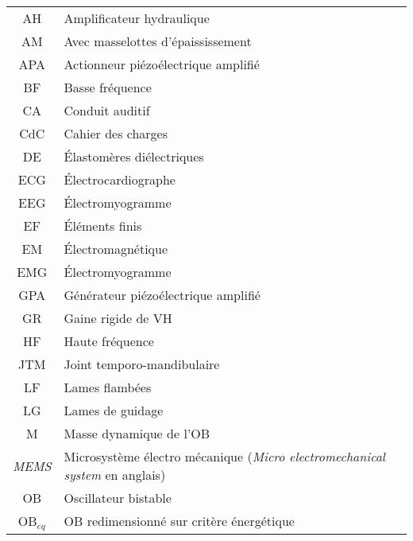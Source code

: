 \begin{table}
      \begin{tabular}{c l}
\toprule
AH          & Amplificateur hydraulique                                      \\
AM          & Avec masselottes d'épaississement \\ 
APA         & Actionneur piézoélectrique amplifié                            \\  \cline{1-1}
BF          & Basse fréquence \\  \cline{1-1}
CA          & Conduit auditif                                                \\
CdC         & Cahier des charges                                             \\  \cline{1-1}
DE          & Élastomères diélectriques                                      \\  \cline{1-1}
ECG         & Électrocardiographe                     \\   
EEG         & Électromyogramme                     \\   
EF          & Éléments finis  \\
EM          & Électromagnétique                                              \\
EMG         & Électromyogramme                     \\    \cline{1-1}
GPA         & Générateur piézoélectrique amplifié                            \\
GR          & Gaine rigide de VH                                             \\  \cline{1-1}
HF          & Haute fréquence \\  \cline{1-1}
JTM         & Joint temporo-mandibulaire                                     \\  \cline{1-1}
LF          & Lames flambées                                                 \\
LG          & Lames de guidage                                               \\  \cline{1-1}
M           & Masse dynamique de l'OB                                        \\
\emph{MEMS} & Microsystème électro mécanique (\emph{Micro electromechanical system} en anglais)\\     
\cline{1-1}                     
OB          & Oscillateur bistable                                           \\
OB$_{eq}$   & OB redimensionné sur critère énergétique                       \\

\end{tabular}
\end{table}
